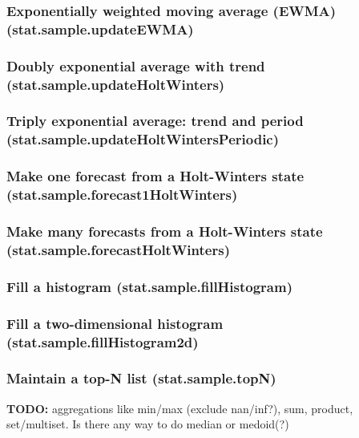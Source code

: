 \documentclass{article}
\theoremstyle{definition}
\begin{document}
\subsubsection{Exponentially weighted moving average (EWMA) (stat.sample.updateEWMA)}

\subsubsection{Doubly exponential average with trend (stat.sample.updateHoltWinters)}

\subsubsection{Triply exponential average: trend and period (stat.sample.updateHoltWintersPeriodic)}

\subsubsection{Make one forecast from a Holt-Winters state (stat.sample.forecast1HoltWinters)}

\subsubsection{Make many forecasts from a Holt-Winters state (stat.sample.forecastHoltWinters)}

\subsubsection{Fill a histogram (stat.sample.fillHistogram)}

\subsubsection{Fill a two-dimensional histogram (stat.sample.fillHistogram2d)}

\subsubsection{Maintain a top-N list (stat.sample.topN)}

{\bf TODO:} aggregations like min/max (exclude nan/inf?), sum, product, set/multiset.  Is there any way to do median or medoid(?)
\end{document}
